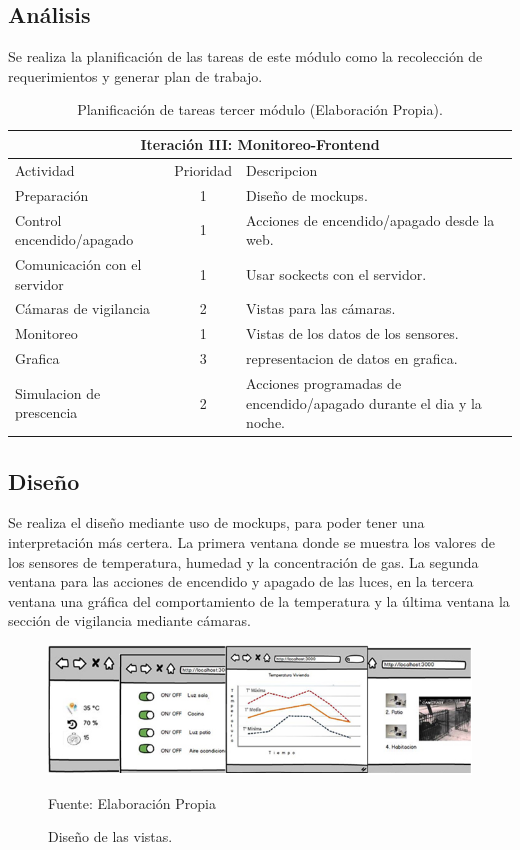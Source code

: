 \documentclass[11pt,letterpaper]{report}
\begin{document}
		\subsection{Análisis}
		Se realiza la planificación de las tareas de este módulo  como la recolección de requerimientos y generar plan de trabajo.
		\begin{table}[H]
			\begin{center} %
				\begin{tabular} {||l | c | p{8cm}||}
					\hline 
					\hline
					\multicolumn{3}{|c|}{Iteración III: Monitoreo-Frontend}\\
					\hline
					\hline 
					 Actividad & Prioridad & Descripcion \\   
					\hline
					\hline
					Preparación & 1 & Diseño de  mockups. \\  
					\hline
					Control encendido/apagado & 1 &Acciones de encendido/apagado desde la web.\\
					\hline
					Comunicación con el servidor & 1 & Usar sockects con el servidor. \\
					\hline
					Cámaras de vigilancia & 2 & Vistas para las cámaras.\\
					\hline
					Monitoreo	& 1 & Vistas de los datos de los sensores.\\
					\hline
					Grafica & 3 & representacion  de datos en grafica.\\
					\hline
					Simulacion de prescencia & 2 & Acciones programadas de encendido/apagado durante el dia y  la noche.\\
					\hline
				\end{tabular}			
			\caption{Planificación de tareas tercer módulo (Elaboración Propia).} 
			\label{tarea1}
			\end{center}
		\end{table}		
	\subsection{Diseño}
	Se realiza el diseño mediante uso de mockups, para poder tener una  interpretación más  certera. La primera ventana donde se muestra los valores de los sensores de temperatura, humedad y la concentración de gas. La segunda ventana para las acciones de encendido y apagado de las luces, en la tercera ventana una gráfica del comportamiento de la temperatura y la última ventana la sección de vigilancia mediante cámaras.	
		\begin{figure}[ht]
		\centering
		\includegraphics[scale=0.6]{imagenes/mockup.png}
		\caption{Diseño de las vistas. }
		Fuente: Elaboración Propia
		\label{mockup} 
		\end{figure}		
\end{document}
